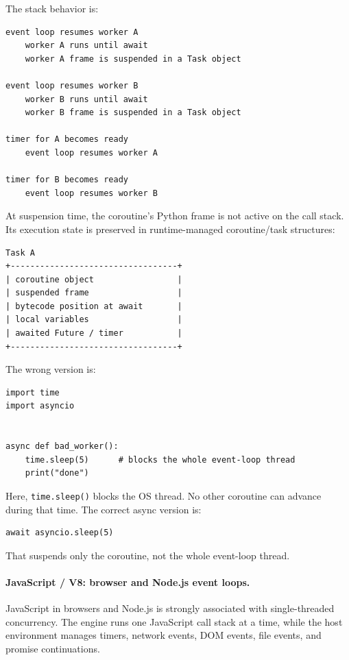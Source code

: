The stack behavior is:

\begin{verbatim}
event loop resumes worker A
    worker A runs until await
    worker A frame is suspended in a Task object

event loop resumes worker B
    worker B runs until await
    worker B frame is suspended in a Task object

timer for A becomes ready
    event loop resumes worker A

timer for B becomes ready
    event loop resumes worker B
\end{verbatim}

At suspension time, the coroutine's Python frame is not active on the call stack. Its execution state is preserved in runtime-managed coroutine/task structures:

\begin{verbatim}
Task A
+----------------------------------+
| coroutine object                 |
| suspended frame                  |
| bytecode position at await       |
| local variables                  |
| awaited Future / timer           |
+----------------------------------+
\end{verbatim}

The wrong version is:

\begin{verbatim}
import time
import asyncio


async def bad_worker():
    time.sleep(5)      # blocks the whole event-loop thread
    print("done")
\end{verbatim}

Here, \texttt{time.sleep()} blocks the OS thread. No other coroutine can advance during that time. The correct async version is:

\begin{verbatim}
await asyncio.sleep(5)
\end{verbatim}

That suspends only the coroutine, not the whole event-loop thread.

\paragraph{JavaScript / V8: browser and Node.js event loops.}

JavaScript in browsers and Node.js is strongly associated with single-threaded concurrency. The engine runs one JavaScript call stack at a time, while the host environment manages timers, network events, DOM events, file events, and promise continuations.

